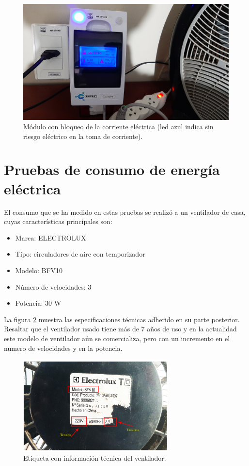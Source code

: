 \vspace{0.5cm}
\begin{figure}[htpb]
\centering 
\includegraphics[width=1.0\textwidth]{./Figures/test/consumo/bloqueo.png}
\caption{Módulo con bloqueo de la corriente eléctrica (led azul indica sin riesgo eléctrico en la toma de corriente).}
\label{fig:test-activa2}
\end{figure}

\vspace{0.5cm}
\section{Pruebas de consumo de energía eléctrica}

El consumo que se ha medido en estas pruebas se realizó a un ventilador de casa, cuyas características principales son:

\begin{itemize}
\item Marca: ELECTROLUX
\item Tipo:	circuladores de aire con temporizador
\item Modelo: BFV10
\item Número de velocidades: 3
\item Potencia: 30 W
\end{itemize}

La figura \ref{fig:ventilador}  muestra las especificaciones técnicas adherido en su parte posterior. Resaltar que el ventilador usado tiene más de 7 años de uso y en la actualidad este modelo de ventilador aún se comercializa, pero con un incremento en el numero de velocidades y en la potencia. 

\begin{figure}[htpb]
\centering 
\includegraphics[width=0.7\textwidth]{./Figures/test/consumo/ventilador.png}
\caption{Etiqueta con información técnica del ventilador.}
\label{fig:ventilador}
\end{figure}


